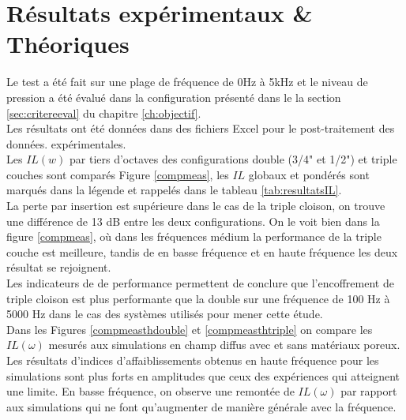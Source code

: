 \documentclass[12pt,foolscap]{report}
\begin{document}
	\section{Résultats expérimentaux \& Théoriques}
	Le test a été fait sur une plage de fréquence de 0Hz à 5kHz et le niveau de pression a été évalué dans la configuration présenté dans le  la section \ref{sec:critereeval} du chapitre \ref{ch:objectif}. \\
	Les résultats ont été données dans des fichiers Excel pour le post-traitement des données. expérimentales.\\
	Les $IL(w)$ par tiers d'octaves des configurations double (3/4" et 1/2") et triple couches sont comparés Figure \ref{compmeas}, les $IL$ globaux et pondérés sont marqués dans la légende et rappelés dans le tableau \ref{tab:resultatsIL}. \\
	
	La perte par insertion est supérieure dans le cas de la triple cloison, on trouve une différence de 13 dB entre les deux configurations. On le voit bien dans la figure \ref{compmeas}, où dans les fréquences médium la performance de la  triple couche est meilleure, tandis de en basse fréquence et en haute fréquence les deux résultat se rejoignent.\\
	Les indicateurs de de performance permettent de conclure que l'encoffrement de triple cloison est plus performante que la double sur une fréquence de 100 Hz à 5000 Hz dans le cas des systèmes utilisés pour mener cette étude.\\
	
	Dans les Figures \ref{compmeasthdouble} et \ref{compmeasthtriple} on compare les $IL(\omega)$ mesurés aux simulations en champ diffus avec et sans matériaux poreux.\\
	Les résultats d'indices d'affaiblissements obtenus en haute fréquence pour les simulations sont plus forts en amplitudes que ceux des expériences qui atteignent une limite. En basse fréquence, on observe une remontée de $IL(\omega)$ par rapport aux simulations qui ne font qu'augmenter de manière générale avec la fréquence. 
	
\end{document}
